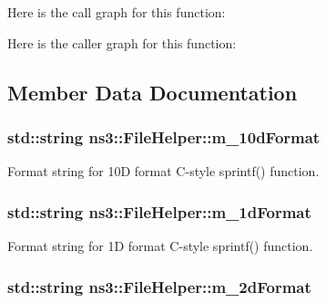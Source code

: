 Here is the call graph for this function\+:




Here is the caller graph for this function\+:




\subsection{Member Data Documentation}
\subsubsection[{\texorpdfstring{m\+\_\+10d\+Format}{m_10dFormat}}]{\setlength{\rightskip}{0pt plus 5cm}std\+::string ns3\+::\+File\+Helper\+::m\+\_\+10d\+Format\hspace{0.3cm}{\ttfamily [private]}}\hypertarget{classns3_1_1FileHelper_a9f89d2419c3ae173761942996aa61247}{}\label{classns3_1_1FileHelper_a9f89d2419c3ae173761942996aa61247}


Format string for 10D format C-\/style sprintf() function. 

\subsubsection[{\texorpdfstring{m\+\_\+1d\+Format}{m_1dFormat}}]{\setlength{\rightskip}{0pt plus 5cm}std\+::string ns3\+::\+File\+Helper\+::m\+\_\+1d\+Format\hspace{0.3cm}{\ttfamily [private]}}\hypertarget{classns3_1_1FileHelper_a9877a5e9438edfec61858113110022e3}{}\label{classns3_1_1FileHelper_a9877a5e9438edfec61858113110022e3}


Format string for 1D format C-\/style sprintf() function. 

\subsubsection[{\texorpdfstring{m\+\_\+2d\+Format}{m_2dFormat}}]{\setlength{\rightskip}{0pt plus 5cm}std\+::string ns3\+::\+File\+Helper\+::m\+\_\+2d\+Format\hspace{0.3cm}{\ttfamily [private]}}\hypertarget{classns3_1_1FileHelper_a8723c77fccac8c1464c45a50244af942}{}\label{classns3_1_1FileHelper_a8723c77fccac8c1464c45a50244af942}


